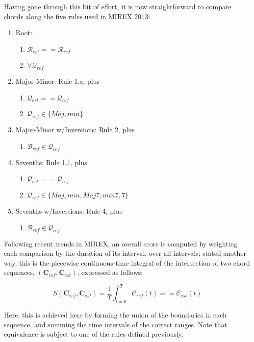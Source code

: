 \documentclass{article}
\begin{document}
Having gone through this bit of effort, it is now straightforward to compare chords along the five rules used in MIREX 2013:
\begin{enumerate}
\item Root:
	\begin{enumerate}
	\item $\mathcal{R}_{est} == \mathcal{R}_{ref}$
	\item $\forall \mathcal{Q}_{ref}$
	\end{enumerate}
\item Major-Minor: Rule 1.a, plus
	\begin{enumerate}
	\item $\mathcal{Q}_{est} == \mathcal{Q}_{ref}$
	\item $\mathcal{Q}_{ref} \in \{Maj, min\}$ 
	\end{enumerate}
\item Major-Minor w/Inversions: Rule 2, plus
	\begin{enumerate}
	\item $\mathcal{B}_{ref} \in \mathcal{Q}_{ref}$
	\end{enumerate}
\item Sevenths: Rule 1.1, plus
	\begin{enumerate}
	\item $\mathcal{Q}_{est} == \mathcal{Q}_{ref} $
	\item $ \mathcal{Q}_{ref} \in \{Maj, min, Maj7, min7, 7\}$ 
	\end{enumerate}
\item Sevenths w/Inversions: Rule 4, plus
	\begin{enumerate}
	\item $\mathcal{B}_{ref} \in \mathcal{Q}_{ref}$ 
	\end{enumerate}
\end{enumerate}

Following recent trends in MIREX, an overall score is computed by weighting each comparison by the duration of its interval, over all intervals; stated another way, this is the piecewise continuous-time integral of the intersection of two chord sequences, $(\mathbf{C}_{ref}, \mathbf{C}_{est})$, expressed as follows:

\begin{equation}
S(\mathbf{C}_{ref}, \mathbf{C}_{est}) = \frac{1}{T}\int_{t=0}^{T} \mathcal{C}_{ref}(t) == \mathcal{C}_{est}(t)
\end{equation}

\noindent Here, this is achieved here by forming the union of the boundaries in each sequence, and summing the time intervals of the correct ranges. Note that equivalence is subject to one of the rules defined previously. 
\end{document}
